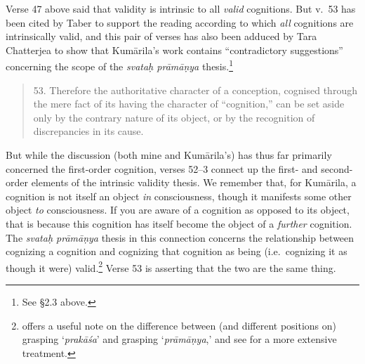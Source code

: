 \documentclass[11pt,letterpaper,oneside]{amsart}
\newcommand{\e}{\emph}
\newenvironment{squote}{\begin{quote}\sf\small}{\rm\end{quote}} %
\newcommand{\kum}{Kum\={a}rila}
\begin{document}
Verse 47 above said that validity is intrinsic to all \emph{valid} cognitions. But v.\ 53 has been cited by Taber to support the reading according to which \emph{all} cognitions are intrinsically valid, and this pair of verses has also been adduced by Tara Chatterjea to show that \kum's work contains ``contradictory suggestions'' concerning the scope of the \emph{svata\d h pr\=am\=a\d nya} thesis.\footnote{See \S2.3 above.}\begin{squote}53. Therefore the authoritative character of a conception, cognised through the mere fact of its having the character of ``cognition,'' can be set aside only by the contrary nature of its object, or by the recognition of discrepancies in its cause.\end{squote} But while the discussion (both mine and Kum\=arila's) has thus far primarily concerned the first-order cognition, verses 52--3 connect up the first- and second-order elements of the intrinsic validity thesis. We remember that, for Kum\=arila, a cognition is not itself an object \e{in} consciousness, though it manifests some other object \e{to} consciousness. If you are aware of a cognition as opposed to its object, that is because this cognition has itself become the object of a \e{further} cognition. The \emph{svata\d h pr\=am\=a\d nya} thesis in this connection concerns the relationship between cognizing a cognition and cognizing that cognition as being (i.e.\ cognizing it as though it were) valid.\footnote{\citet[p.\ 3]{mohanty1989gangesa} offers a useful note on the difference between (and different positions on) grasping `\emph{prak\=a\'sa}' and grasping `\emph{pr\=am\=a\d nya},' and see \citet{sen1984concept} for a more extensive treatment.} Verse 53 is asserting that the two are the same thing.
\end{document}
